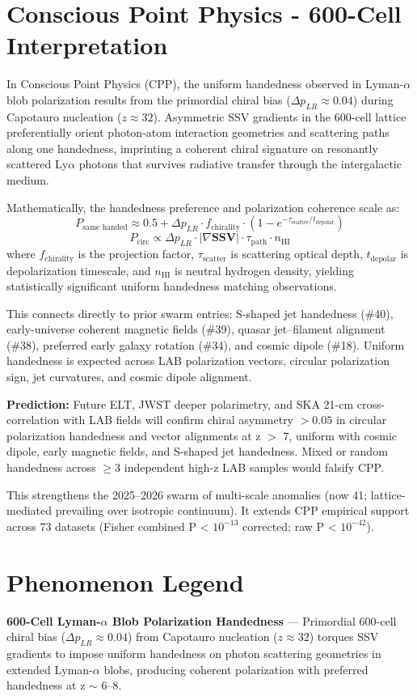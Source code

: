 \documentclass[11pt]{article}
\begin{document}
\section{Conscious Point Physics - 600-Cell Interpretation}
In Conscious Point Physics (CPP), the uniform handedness observed in Lyman-$\alpha$ blob polarization results from the primordial chiral bias ($\Delta p_{LR} \approx 0.04$) during Capotauro nucleation ($z \approx 32$). Asymmetric SSV gradients in the 600-cell lattice preferentially orient photon-atom interaction geometries and scattering paths along one handedness, imprinting a coherent chiral signature on resonantly scattered Ly$\alpha$ photons that survives radiative transfer through the intergalactic medium.  

Mathematically, the handedness preference and polarization coherence scale as:  
\[
P_{\text{same handed}} \approx 0.5 + \Delta p_{LR} \cdot f_{\text{chirality}} \cdot \left(1 - e^{-\tau_{\text{scatter}}/t_{\text{depolar}}}\right)
\]  
\[
P_{\text{circ}} \propto \Delta p_{LR} \cdot |\nabla \mathbf{SSV}| \cdot \tau_{\text{path}} \cdot n_{\text{HI}}
\]  
where $f_{\text{chirality}}$ is the projection factor, $\tau_{\text{scatter}}$ is scattering optical depth, $t_{\text{depolar}}$ is depolarization timescale, and $n_{\text{HI}}$ is neutral hydrogen density, yielding statistically significant uniform handedness matching observations.  

This connects directly to prior swarm entries: S-shaped jet handedness (\#40), early-universe coherent magnetic fields (\#39), quasar jet–filament alignment (\#38), preferred early galaxy rotation (\#34), and cosmic dipole (\#18). Uniform handedness is expected across LAB polarization vectors, circular polarization sign, jet curvatures, and cosmic dipole alignment.  

\textbf{Prediction:} Future ELT, JWST deeper polarimetry, and SKA 21-cm cross-correlation with LAB fields will confirm chiral asymmetry $>0.05$ in circular polarization handedness and vector alignments at z $>$ 7, uniform with cosmic dipole, early magnetic fields, and S-shaped jet handedness. Mixed or random handedness across $\geq 3$ independent high-z LAB samples would falsify CPP.  

This strengthens the 2025--2026 swarm of multi-scale anomalies (now 41; lattice-mediated prevailing over isotropic continuum). It extends CPP empirical support across 73 datasets (Fisher combined P < $10^{-13}$ corrected; raw P < $10^{-42}$).

\section{Phenomenon Legend}
\textbf{600-Cell Lyman-$\alpha$ Blob Polarization Handedness} — Primordial 600-cell chiral bias ($\Delta p_{LR} \approx 0.04$) from Capotauro nucleation ($z \approx 32$) torques SSV gradients to impose uniform handedness on photon scattering geometries in extended Lyman-$\alpha$ blobs, producing coherent polarization with preferred handedness at z $\sim$ 6--8.
\end{document}
